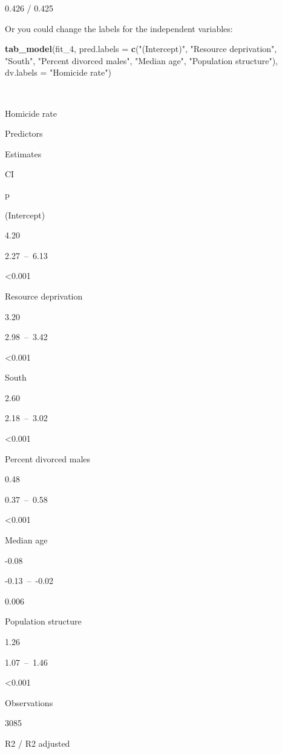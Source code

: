 \documentclass[]{book}
\newenvironment{Shaded}{\begin{snugshade}}{\end{snugshade}}
\newcommand{\DataTypeTok}[1]{\textcolor[rgb]{0.13,0.29,0.53}{#1}}
\newcommand{\DecValTok}[1]{\textcolor[rgb]{0.00,0.00,0.81}{#1}}
\newcommand{\KeywordTok}[1]{\textcolor[rgb]{0.13,0.29,0.53}{\textbf{#1}}}
\newcommand{\NormalTok}[1]{#1}
\newcommand{\StringTok}[1]{\textcolor[rgb]{0.31,0.60,0.02}{#1}}
\begin{document}
0.426 / 0.425

Or you could change the labels for the independent variables:

\begin{Shaded}
\begin{Highlighting}[]
\KeywordTok{tab_model}\NormalTok{(fit_}\DecValTok{4}\NormalTok{, }\DataTypeTok{pred.labels =} \KeywordTok{c}\NormalTok{(}\StringTok{"(Intercept)"}\NormalTok{, }\StringTok{"Resource deprivation"}\NormalTok{, }\StringTok{"South"}\NormalTok{, }\StringTok{"Percent divorced males"}\NormalTok{, }\StringTok{"Median age"}\NormalTok{, }\StringTok{"Population structure"}\NormalTok{), }\DataTypeTok{dv.labels =} \StringTok{"Homicide rate"}\NormalTok{)}
\end{Highlighting}
\end{Shaded}

~

Homicide rate

Predictors

Estimates

CI

p

(Intercept)

4.20

2.27~--~6.13

\textless{}0.001

Resource deprivation

3.20

2.98~--~3.42

\textless{}0.001

South

2.60

2.18~--~3.02

\textless{}0.001

Percent divorced males

0.48

0.37~--~0.58

\textless{}0.001

Median age

-0.08

-0.13~--~-0.02

0.006

Population structure

1.26

1.07~--~1.46

\textless{}0.001

Observations

3085

R2 / R2 adjusted
\end{document}
